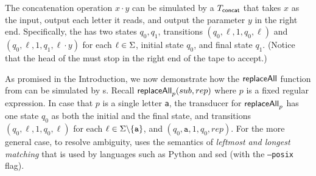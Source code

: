 \begin{example} \label{example:2pt}
 The concatenation operation $x \cdot y$ can be simulated by a \PT{} $T_{\mathsf{concat}}$  that takes $x$ as the input, output each letter it reads, and output the parameter $y$ in the right end. Specifically, the \PT{} has two states $q_0, q_1$, transitions $(q_0, \ell, 1, q_0, \ell)$ and $(q_0, \ell, 1, q_1, \ell \cdot y)$ for each $\ell \in \Sigma$,  initial state $q_0$, and final state $q_1$. (Notice that the head of the \PT{} must stop in the right end of the tape to accept.) 
 
  As promised in the Introduction, we now demonstrate how the  $\mathsf{replaceAll}$ function from \cite{CCHLW18} can be simulated by \PT{}s.
%
 Recall $\mathsf{replaceAll}_{p}(sub, rep)$ where $p$ is a fixed regular expression. %
    In case that $p$ is  a single letter \texttt{a}, the transducer for $\mathsf{replaceAll}_{p}$ has one state $q_0$ as both the initial and the final state,
    and transitions 
    $(q_0,\ell, 1, q_0, \ell)$ for each $\ell \in \Sigma \backslash
    \{\texttt{a}\}$, 
    and $(q_0, \texttt{a}, 1, q_0, rep)$. For the more general case, to resolve ambiguity, \cite{CCHLW18} uses the semantics of \emph{leftmost and longest matching} that is used by languages such as Python and sed (with the  \texttt{--posix} flag).

\end{example}
